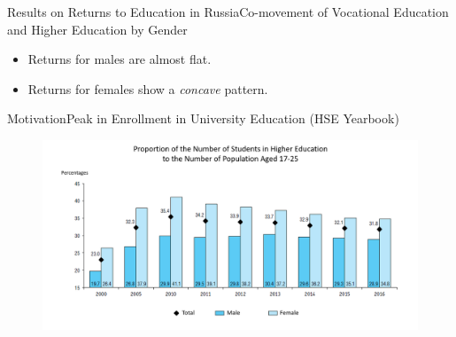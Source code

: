 \documentclass{beamer}
\begin{document}
\begin{frame}{Results on Returns to Education in Russia}{Co-movement of Vocational Education and Higher Education by Gender}
	\begin{figure}
		\centering
		\hfill
	\end{figure}
	\begin{itemize}
		\vspace*{-0.2in}
		\item Returns for males are almost flat.
		\item Returns for females show a \textit{concave} pattern.
	\end{itemize}
\end{frame}



\begin{frame}{Motivation}{Peak in Enrollment in University Education (HSE Yearbook)}
\begin{figure}
	\centering
	\vspace*{-0.2in}
	\hspace*{-0.3in}
	\includegraphics[width=350pt]{graph_1b.png}
\end{figure}
\end{frame}
	
\end{document}
